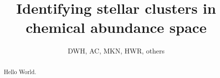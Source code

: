 \documentclass[12pt, letterpaper, preprint]{aastex}
\begin{document}
\title{Identifying stellar clusters in chemical abundance space}
\author{DWH, AC, MKN, HWR, others}

\begin{abstract}
Hello World.
\end{abstract}
\end{document}
